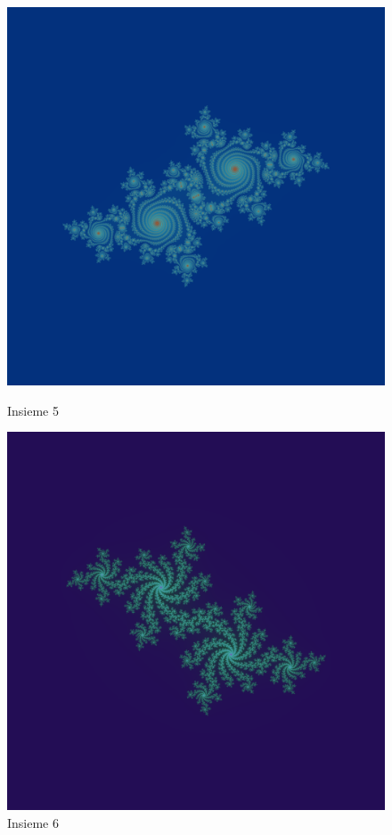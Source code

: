 \documentclass[10pt]{report}
\begin{document}
				\begin{figure}[H]
					\centering
					\includegraphics[width=0.5\linewidth]{"Insieme di Julia/julia7"}
					\caption*{ \footnotesize{Insieme 5} }
					\label{fig:julia5}
					\endminipage \hfill
					\centering
					\includegraphics[width=0.5\linewidth]{"Insieme di Julia/julia8"}
					\caption*{ \footnotesize{Insieme 6} }
					\label{fig:julia6}
					\endminipage \hfill
				\end{figure}
\end{document}
